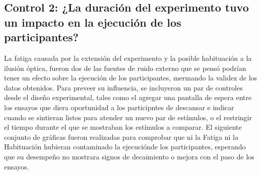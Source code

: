 \begin{itemize}

\end{itemize}










\subsection{Control 2: ¿La duración del experimento tuvo un impacto en la ejecución de los participantes?}

La fatiga causada por la extensión del experimento y la posible habituación a la ilusión óptica, fueron dos de las fuentes de ruido externo que se pensó podrían tener un efecto sobre la ejecución de los participantes, mermando la validez de los datos obtenidos. Para preveer su influencia, se incluyeron un par de controles desde el diseño experimental, tales como el agregar una pantalla de espera entre los ensayos que diera oportunidad a los participntes de descansar e indicar cuando se sintieran listos para atender un nuevo par de estímulos, o el restringir el tiempo durante el que se mostraban los estímulos a comparar. El siguiente conjunto de gráficas fueron realizadas para comprobar que ni la Fatiga ni la Habituación hubieran contaminado la ejecuciónde los participantes, esperando que su desempeño no mostrara signos de decaimiento o mejora con el paso de los ensayos. 

